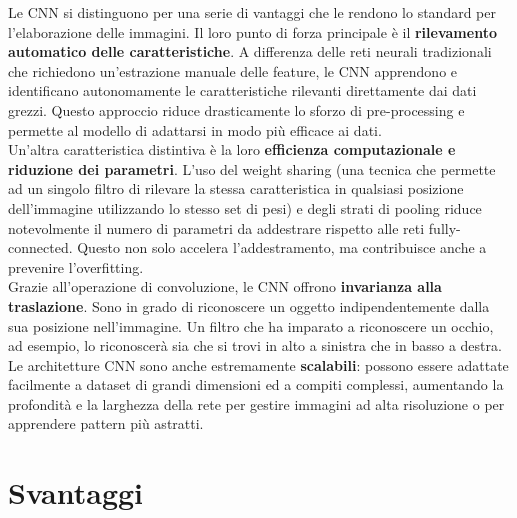 \documentclass[a4paper,12pt]{report}
\begin{document}
	Le CNN si distinguono per una serie di vantaggi che le rendono lo standard per l'elaborazione delle immagini. Il loro punto di forza principale è il \textbf{rilevamento automatico delle caratteristiche}. A differenza delle reti neurali tradizionali che richiedono un'estrazione manuale delle feature, le CNN apprendono e identificano autonomamente le caratteristiche rilevanti direttamente dai dati grezzi. Questo approccio riduce drasticamente lo sforzo di pre-processing e permette al modello di adattarsi in modo più efficace ai dati. \\
	Un'altra caratteristica distintiva è la loro \textbf{efficienza computazionale e riduzione dei parametri}. L'uso del weight sharing (una tecnica che permette ad un singolo filtro di rilevare la stessa caratteristica in qualsiasi posizione dell'immagine utilizzando lo stesso set di pesi) e degli strati di pooling riduce notevolmente il numero di parametri da addestrare rispetto alle reti fully-connected. Questo non solo accelera l'addestramento, ma contribuisce anche a prevenire l'overfitting. \\
	Grazie all'operazione di convoluzione, le CNN offrono \textbf{invarianza alla traslazione}. Sono in grado di riconoscere un oggetto indipendentemente dalla sua posizione nell'immagine. Un filtro che ha imparato a riconoscere un occhio, ad esempio, lo riconoscerà sia che si trovi in alto a sinistra che in basso a destra. \\
	Le architetture CNN sono anche estremamente \textbf{scalabili}: possono essere adattate facilmente a dataset di grandi dimensioni ed a compiti complessi, aumentando la profondità e la larghezza della rete per gestire immagini ad alta risoluzione o per apprendere pattern più astratti.
	
	\section{Svantaggi}
	
\end{document}
